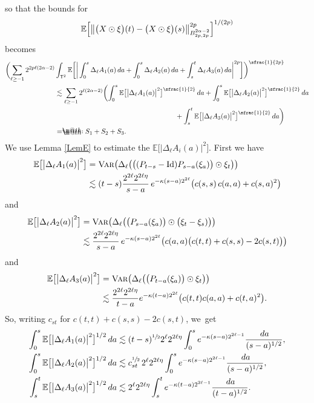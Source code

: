 \documentclass[10pt]{amsart}
\makeatletter
\theoremstyle{definition}
\newcommand\bbE{\mathbb{E}}
\newcommand*{\eqdef}{=\mathrel{\rlap{%
\raisebox{0.3ex}{$\m@th\cdot$}}%
\raisebox{-0.3ex}{$\m@th\cdot$}}%
}
\makeatother
\begin{document}
so that the bounds for
\[
\bbE\Bigl[\big\Vert\bigl(X\odot\xi\bigr)(t)-\bigl(X\odot\xi\bigr)(s)\big\Vert_{B^{2\alpha-2}_{2p,2p}}^{2p}\Bigr]^{1/(2p)}
\]
becomes
\begin{align*}
\biggl( \sum_{\ell\geq -1} 2^{2p\ell(2\alpha-2)}&\int_{\mathsf{T}^2} \bbE\biggl[ \bigg| \int_0^s \Delta_\ell A_1(a)\,da + \int_0^s \Delta_\ell A_2(a)\,da + \int_s^t \Delta_\ell A_3(a)\,da \bigg|^{2p}\biggr] \biggr)^{\sfrac{1}{2p}} \\
&\lesssim \sum_{\ell\geq -1} 2^{\ell(2\alpha-2)}\biggl(\int_0^s \bbE\bigl[\big| \Delta_\ell A_1(a)\big|^2 \bigr]^{\sfrac{1}{2}} \,da + \int_0^s \bbE\bigl[\big| \Delta_\ell A_2(a)\big|^2 \bigr]^{\sfrac{1}{2}} \,da \\
&\hspace*{6.1cm}+ \int_s^t \bbE\bigl[\big| \Delta_\ell A_3(a)\big|^2 \bigr]^{\sfrac{1}{2}} \,da \biggr) \\
&\eqdef S_1+S_2+S_3.
\end{align*}
We use Lemma \ref{LemE} to estimate the $\bbE\bigl[\big| \Delta_\ell A_i(a)\big|^2 \bigr]$. First we have
\begin{align*}
\bbE\bigl[\big| \Delta_\ell A_1(a)\big|^2 \bigr] &= \textsc{{Var}}\bigl( \Delta_\ell \bigl(\bigl( (P_{t-s} - \textrm{Id})P_{s-a}(\xi_a) \bigr)\odot\xi_t\bigr)\bigr)
\\
&\lesssim (t-s)\frac{2^{2\ell}2^{2\ell\eta}}{s-a}\,e^{-\kappa(s-a)2^{2\ell}}\bigl(c(s,s)\,c(a,a) + c(s,a)^2 \bigr)
\end{align*}
and
\begin{align*}
\bbE\bigl[\big| \Delta_\ell A_2(a)\big|^2 \bigr] &= \textsc{{Var}}\bigl( \Delta_\ell \bigl(\bigl( P_{s-a}(\xi_a) \bigr)\odot\bigl(\xi_t-\xi_s)\bigr)\bigr)
\\
&\lesssim \frac{2^{2\ell}2^{2\ell\eta}}{s-a} \, e^{-\kappa(s-a)2^{2\ell}} \bigl( c(a,a)\bigl(c(t,t) + c(s,s) - 2c(s,t)\bigr) \bigr)
\end{align*}
and
\begin{align*}
\bbE\bigl[\big| \Delta_\ell A_3(a)\big|^2 \bigr] &= \textsc{{Var}}\bigl( \Delta_\ell \bigl(\bigl( P_{t-a}(\xi_a) \bigr)\odot\xi_t\bigr)\bigr)
\\
&\lesssim \frac{2^{2\ell}2^{2\ell\eta}}{t-a}e^{-\kappa(t-a)2^{2\ell}}\bigl( c(t,t) c(a,a) + c(t,a)^2 \bigr).
\end{align*}
So, writing $c_{st}$ for $c(t,t)+c(s,s)-2c(s,t)$, we~get
\begin{align*}
\int_0^s \bbE\bigl[\big| \Delta_\ell A_1(a)\big|^2 \bigr]^{1/2} \,da &\lesssim (t-s)^{\sfrac{1}{2}} 2^\ell 2^{2\ell\eta} \int_0^s e^{-\kappa(s-a)2^{2\ell-1}}\frac{\,da}{(s-a)^{1/2}},
\\
\int_0^s \bbE\bigl[\big| \Delta_\ell A_2(a)\big|^2 \bigr]^{1/2} \,da &\lesssim c_{st}^{\sfrac{1}{2}} \, 2^\ell 2^{2\ell\eta}\int_0^s e^{-\kappa(s-a)2^{2\ell-1}}\frac{\,da}{(s-a)^{1/2}},
\\
\int_s^t \bbE\bigl[\big| \Delta_\ell A_3(a)\big|^2 \bigr]^{1/2} \,da &\lesssim 2^\ell 2^{2\ell\eta}\int_s^t e^{-\kappa(t-a)2^{2\ell-1}}\frac{\,da}{(t-a)^{1/2}}.
\end{align*}
\end{document}
